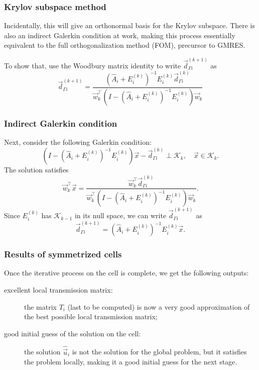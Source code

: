 \documentclass{beamer}
\begin{document}
\begin{frame}
\frametitle{Krylov subspace method}

Incidentally, this will give an orthonormal basis for the Krylov subspace.
There is also an indirect Galerkin condition at work, making this process essentially equivalent to the full orthogonalization method (FOM), precursor to GMRES.

To show that,
use the Woodbury matrix identity to write $\vec{d}_{\Gamma i}^{(k+1)}$ as
\begin{equation*}
	\vec{d}_{\Gamma i}^{(k+1)} = \frac{ \left ( \hat{A}_i + E_{i}^{(k)} \right )^{-1} E_{i}^{(k)} \vec{d}_{\Gamma i}^{(k)} }{ \vec{w}_k^\top \left ( I - \left ( \hat{A}_i + E_{i}^{(k)} \right )^{-1} E_{i}^{(k)} \right ) \vec{w}_k}
\end{equation*}

\end{frame}

\begin{frame}
\frametitle{Indirect Galerkin condition}

Next, consider the following Galerkin condition:
\begin{equation*}	
	\left ( I - \left ( \hat{A}_i + E_{i}^{(k)} \right )^{-1} E_{i}^{(k)}  \right ) \vec{x} - \vec{d}_{\Gamma i}^{(k)} \perp \mathcal{K}_k, \quad \vec{x} \in \mathcal{K}_k.
\end{equation*}
The solution satisfies
\begin{equation*}
	\vec{w}_k^\top \vec{x} = \frac{\vec{w}_k^\top \vec{d}_{\Gamma i}^{(k)}}{\vec{w}_k^\top \left ( I - \left ( \hat{A}_i + E_{i}^{(k)} \right )^{-1} E_{i}^{(k)} \right ) \vec{w}_k} .
\end{equation*}
Since $E_i^{(k)}$ has $\mathcal{K}_{k-1}$ in its null space, we can write $\vec{d}_{\Gamma i}^{(k+1)}$ as
\begin{equation*}
	\vec{d}_{\Gamma i}^{(k+1)} = \left ( \hat{A}_i + E_{i}^{(k)} \right )^{-1} E_{i}^{(k)} \vec{x}.
\end{equation*}

\end{frame}

\begin{frame}
\frametitle{Results of symmetrized cells}

Once the iterative process on the cell is complete, we get the following outputs:
\begin{description}
\item[excellent local transmission matrix:] the matrix $T_i$ (last to be computed) is now a very good approximation of the best possible local transmission matrix;
\item[good initial guess of the solution on the cell:] the solution $\hat{\vec{u}}_i$ is not the solution for the global problem, but it satisfies the problem locally, making it a good initial guess for the next stage.
\end{description}

\end{frame}
\end{document}
